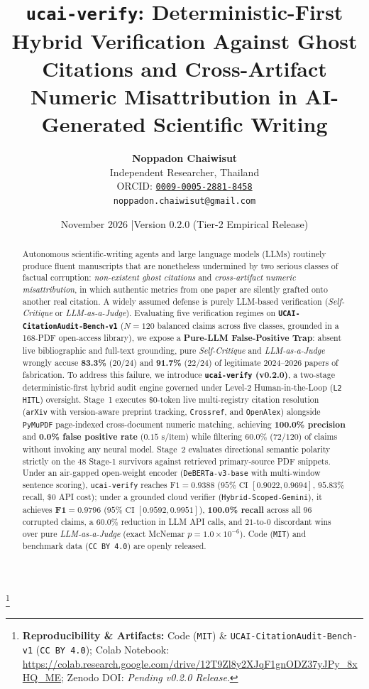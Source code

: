 \documentclass[10pt,twocolumn]{article}
\title{\textbf{\texttt{ucai-verify}: Deterministic-First Hybrid Verification Against Ghost Citations and Cross-Artifact Numeric Misattribution in AI-Generated Scientific Writing}}
\author{
  \textbf{Noppadon Chaiwisut} \\
  Independent Researcher, Thailand \\
  ORCID: \href{https://orcid.org/0009-0005-2881-8458}{\texttt{0009-0005-2881-8458}} \\
  \texttt{noppadon.chaiwisut@gmail.com}
}
\date{November 2026 \quad|\quad Version 0.2.0 (Tier-2 Empirical Release)}
\begin{document}
\maketitle
\thispagestyle{plain}
\begingroup
\renewcommand\thefootnote{}\footnote{\noindent\textbf{Reproducibility \& Artifacts:} Code (\texttt{MIT}) \& \texttt{UCAI-CitationAudit-Bench-v1} (\texttt{CC BY 4.0}); Colab Notebook: \url{https://colab.research.google.com/drive/12T9Zl8y2XJqF1gnODZ37yJPy_8xHQ_ME}; Zenodo DOI: \textit{Pending v0.2.0 Release}.}
\addtocounter{footnote}{-1}
\endgroup

\begin{abstract}
Autonomous scientific-writing agents and large language models (LLMs) routinely produce fluent manuscripts that are nonetheless undermined by two serious classes of factual corruption: \emph{non-existent ghost citations} and \emph{cross-artifact numeric misattribution}, in which authentic metrics from one paper are silently grafted onto another real citation. A widely assumed defense is purely LLM-based verification (\emph{Self-Critique} or \emph{LLM-as-a-Judge}). Evaluating five verification regimes on \textbf{\texttt{UCAI-CitationAudit-Bench-v1}} ($N = 120$ balanced claims across five classes, grounded in a 168-PDF open-access library), we expose a \textbf{Pure-LLM False-Positive Trap}: absent live bibliographic and full-text grounding, pure \emph{Self-Critique} and \emph{LLM-as-a-Judge} wrongly accuse \textbf{83.3\%} ($20/24$) and \textbf{91.7\%} ($22/24$) of legitimate 2024--2026 papers of fabrication. To address this failure, we introduce \textbf{\texttt{ucai-verify} (v0.2.0)}, a two-stage deterministic-first hybrid audit engine governed under Level-2 Human-in-the-Loop (\texttt{L2 HITL}) oversight. Stage~1 executes $\$0$-token live multi-registry citation resolution (\texttt{arXiv} with version-aware preprint tracking, \texttt{Crossref}, and \texttt{OpenAlex}) alongside \texttt{PyMuPDF} page-indexed cross-document numeric matching, achieving \textbf{100.0\% precision} and \textbf{0.0\% false positive rate} ($0.15\text{ s/item}$) while filtering $60.0\%$ ($72/120$) of claims without invoking any neural model. Stage~2 evaluates directional semantic polarity strictly on the $48$ Stage-1 survivors against retrieved primary-source PDF snippets. Under an air-gapped open-weight encoder (\texttt{DeBERTa-v3-base} with multi-window sentence scoring), \texttt{ucai-verify} reaches $\mathrm{F1} = 0.9388$ ($95\%\text{ CI } [0.9022, 0.9694]$, $95.83\%$ recall, $\$0$ API cost); under a grounded cloud verifier (\texttt{Hybrid-Scoped-Gemini}), it achieves $\mathbf{F1 = 0.9796}$ ($95\%\text{ CI } [0.9592, 0.9951]$), \textbf{100.0\% recall} across all $96$ corrupted claims, a $60.0\%$ reduction in LLM API calls, and $21$-to-$0$ discordant wins over pure \emph{LLM-as-a-Judge} (exact McNemar $p = 1.0 \times 10^{-6}$). Code (\texttt{MIT}) and benchmark data (\texttt{CC BY 4.0}) are openly released.
\end{abstract}
\end{document}
